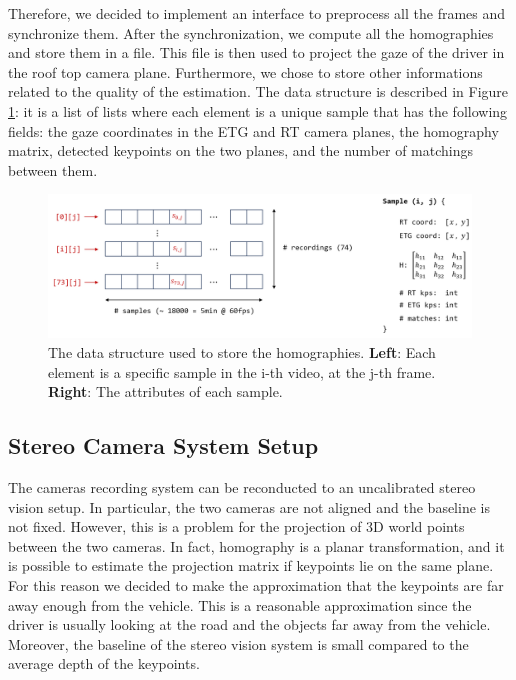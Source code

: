 Therefore, we decided to implement 
an interface to preprocess all the frames and synchronize them.
After the synchronization, we compute all the homographies and store them in a 
file. This file is then used to project the gaze of the driver in the roof top 
camera plane.
Furthermore, we chose to store other informations related to the quality of the 
estimation.
The data structure is described in Figure \ref{fig:homography_data_structure}:
it is a list of lists where each element is a unique sample that has the 
following fields: the gaze coordinates in the ETG and RT camera planes, the 
homography matrix, detected keypoints on the two planes, and the number of 
matchings between them.

\begin{figure}
    \centering
    \includegraphics[width=\textwidth]{images/dreyeve/homography_data.png}
    \caption[Data structure to store homographies]
    {The data structure used to store the homographies.
    \textbf{Left}: Each element is a specific sample in the i-th video, at 
    the j-th frame.
    \textbf{Right}: The attributes of each sample.}
    \label{fig:homography_data_structure}
\end{figure}

\subsection{Stereo Camera System Setup}
The cameras recording system can be reconducted to an uncalibrated stereo vision 
setup. In particular, the two cameras are not aligned and the baseline is not 
fixed. However, this is a problem for the projection of 3D world points between 
the two cameras. In fact, homography is a planar transformation, 
and it is possible to estimate the projection matrix if keypoints lie on the 
same plane.
For this reason we decided to make the approximation that the 
keypoints are far away enough from the vehicle. This is a reasonable 
approximation since the driver is usually looking at the road and the objects 
far away from the vehicle. Moreover, the baseline of the stereo vision system is 
small compared to the average depth of the keypoints.

